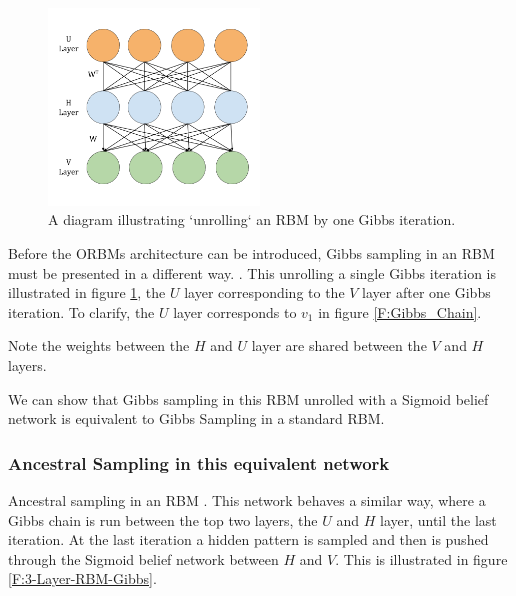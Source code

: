 \begin{figure}
  \begin{center}
    \includegraphics[width=0.5\textwidth]{Assets/3_Layer_RBM.png}
  \end{center}
  \caption{A diagram illustrating `unrolling` an RBM by one Gibbs iteration.}
  \label{F:3-Layer-RBM}
\end{figure}

Before the ORBMs architecture can be introduced, Gibbs sampling in an RBM must be presented in a different way. . This unrolling a single Gibbs iteration is illustrated in figure \ref{F:3-Layer-RBM}, the $U$ layer corresponding to the $V$ layer after one Gibbs iteration. To clarify, the $U$ layer corresponds to $v_1$ in figure \ref{F:Gibbs_Chain}.

Note the weights between the $H$ and $U$ layer are shared between the $V$ and $H$ layers.


We can show that Gibbs sampling in this RBM unrolled with a Sigmoid belief network is equivalent to Gibbs Sampling in a standard RBM.



\subsubsection{Ancestral Sampling in this equivalent network}

Ancestral sampling in an RBM . This network behaves a similar way, where a Gibbs chain is run between the top two layers, the $U$ and $H$ layer, until the last iteration. At the last iteration a hidden pattern is sampled and then is pushed through the Sigmoid belief network between $H$ and $V$. This is illustrated in figure \ref{F:3-Layer-RBM-Gibbs}.

